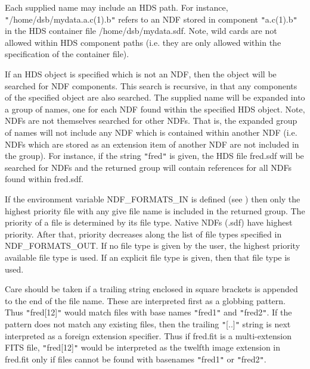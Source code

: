 \documentclass[twoside,11pt,nolof]{starlink}
\begin{document}
{{{         \sstitem
         Each supplied name may include an HDS path. For instance,
         \texttt{"}/home/dsb/mydata.a.c(1).b\texttt{"} refers to an NDF stored in component
         \texttt{"}a.c(1).b\texttt{"} in the HDS container file /home/dsb/mydata.sdf. Note,
         wild cards are not allowed within HDS component paths (i.e. they
         are only allowed within the specification of the container file).

         \sstitem
         If an HDS object is specified which is not an NDF, then the
         object will be searched for NDF components. This search is
         recursive, in that any components of the specified object are also
         searched. The supplied name will be expanded into a group of names,
         one for each NDF found within the specified HDS object. Note, NDFs
         are not themselves searched for other NDFs. That is, the expanded
         group of names will not include any NDF which is contained within
         another NDF (i.e. NDFs which are stored as an extension item of
         another NDF are not included in the group). For instance, if the
         string \texttt{"}fred\texttt{"} is given, the HDS file fred.sdf will be searched for
         NDFs and the returned group will contain references for all NDFs
         found within fred.sdf.

         \sstitem
         If the environment variable NDF\_FORMATS\_IN is defined (see
         ) then only the highest priority file with any give file name
         is included in the returned group. The priority of a file is
         determined by its file type. Native NDFs (.sdf) have highest
         priority. After that, priority decreases along the list of file
         types specified in NDF\_FORMATS\_OUT. If no file type is given by
         the user, the highest priority available file type is used. If an
         explicit file type is given, then that file type is used.

         \sstitem

         Care should be taken if a trailing string enclosed in square
	 brackets is appended to the end of the file name. These are
	 interpreted first as a globbing pattern. Thus \texttt{"}fred[12]\texttt{"} would match files with base names \texttt{"}fred1\texttt{"} and \texttt{"}fred2\texttt{"}. If the pattern does not
	 match any existing files, then the trailing \texttt{"}[..]\texttt{"}
	 string is next interpreted as a foreign extension specifier.
	 Thus if fred.fit is a multi-extension FITS file, \texttt{"}fred[12]\texttt{"} would be interpreted as the twelfth image
	 extension in fred.fit only if files cannot be found with
	 basenames \texttt{"}fred1\texttt{"} or \texttt{"}fred2\texttt{"}.

}}}
\end{document}
